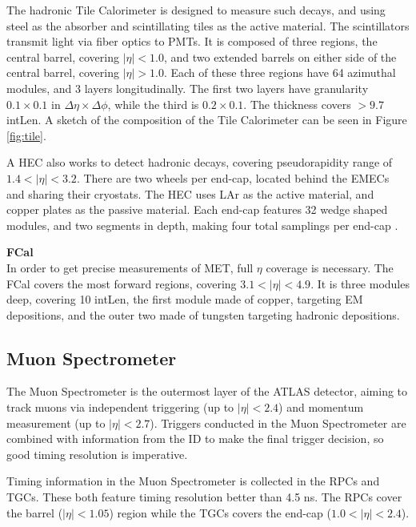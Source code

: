 \indent The hadronic Tile Calorimeter is designed to measure such decays, and using steel as the absorber and scintillating tiles as the active material. The scintillators transmit light via fiber optics to \glspl{PMT}. It is composed of three regions, the central barrel, covering $|\eta| < 1.0$, and two extended barrels on either side of the central barrel, covering $|\eta| > 1.0$. Each of these three regions have 64 azimuthal modules, and 3 layers longitudinally. The first two layers have granularity $0.1 \times 0.1$ in $\Delta\eta \times \Delta \phi$, while the third is $0.2 \times 0.1$. The thickness covers $>9.7$ \gls{intLen}. A sketch of the composition of the Tile Calorimeter can be seen in Figure \ref{fig:tile}.

A \gls{HEC} also works to detect hadronic decays, covering pseudorapidity range of $1.4 < |\eta| < 3.2$. There are two wheels per end-cap, located behind the \glspl{EMEC} and sharing their cryostats. The \gls{HEC} uses \gls{LAr} as the active material, and copper plates as the passive material. Each end-cap features 32 wedge shaped modules, and two segments in depth, making four total samplings per end-cap \cite{lar-tdr}.


\noindent\textbf{\gls{FCal}}\\
\indent In order to get precise measurements of \gls{MET}, full $\eta$ coverage is necessary. The \gls{FCal} covers the most forward regions, covering $3.1 < |\eta| < 4.9$. It is three modules deep, covering 10 \gls{intLen}, the first module made of copper, targeting \gls{EM} depositions, and the outer two made of tungsten targeting hadronic depositions.


\subsection{Muon Spectrometer} \label{ssec:muonspectrometer}
The Muon Spectrometer \cite{muon-tdr} is the outermost layer of the ATLAS detector, aiming to track muons via independent triggering (up to $|\eta| < 2.4$) and momentum measurement (up to $|\eta| < 2.7$). Triggers conducted in the Muon Spectrometer are combined with information from the \gls{ID} to make the final trigger decision, so good timing resolution is imperative.

Timing information in the Muon Spectrometer is collected in the \glspl{RPC} and \glspl{TGC}. These both feature timing resolution better than 4.5 ns. The \glspl{RPC} cover the barrel ($|\eta| < 1.05$) region while the \glspl{TGC} covers the end-cap ($1.0<|\eta|<2.4$).

